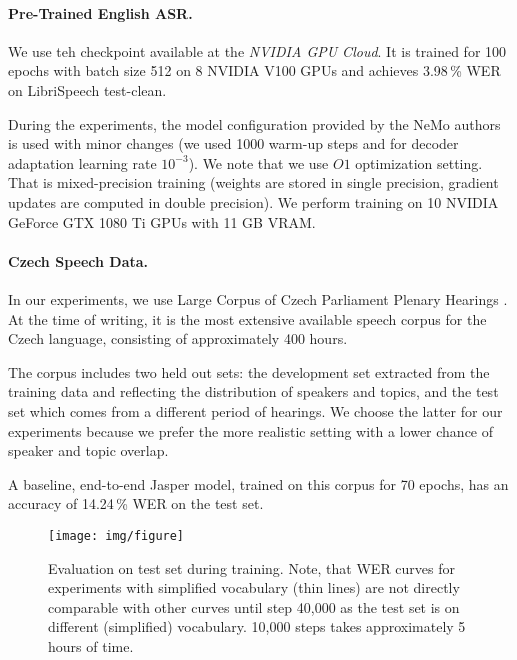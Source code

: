 
\paragraph{Pre-Trained English ASR.}

We use teh checkpoint available at the \textit{NVIDIA GPU Cloud}. It is trained for 100 epochs with batch size 512 on 8 NVIDIA V100 GPUs and achieves 3.98\,\% WER on LibriSpeech  test-clean.

During the experiments, the model configuration provided by the NeMo authors is used with minor changes (we used 1000 warm-up steps and for decoder adaptation learning rate $10^{-3}$). We note that we use $O1$ optimization setting. That is mixed-precision training (weights are stored in single precision, gradient updates are computed in double precision). We perform training on 10 NVIDIA GeForce GTX 1080 Ti GPUs with 11 GB VRAM.


\paragraph{Czech Speech Data.}
In our experiments, we use Large Corpus of Czech Parliament Plenary Hearings . At the time of writing, it is the most extensive available speech corpus for the Czech language, consisting of approximately 400 hours.

The corpus includes two held out sets: the development set extracted from the training data and reflecting the distribution of speakers and topics, and the test set which comes from a different period of hearings. We choose the latter for our experiments because we prefer the more realistic setting with a lower chance of speaker and topic overlap.

A baseline, end-to-end Jasper model, trained on this corpus for 70 epochs, has an accuracy of 14.24\,\% WER on the test set.

\begin{landscape}
	\begin{figure}[t]
		\texttt{[image: img/figure]}
		\caption{Evaluation on test set during training. %
			Note, that WER curves for experiments with simplified vocabulary (thin lines) are not directly comparable with other curves until step 40,000 as the test set is on different (simplified) vocabulary. 10,000 steps takes approximately 5 hours of time.}
		\label{fig:training}
	\end{figure}
\end{landscape}


